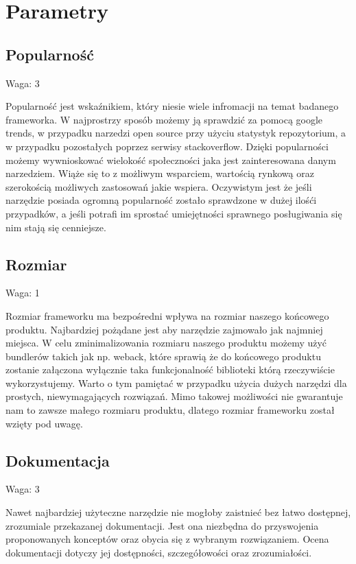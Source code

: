\documentclass[12pt]{report}
\begin{document}
  \section{Parametry}
    \subsection{Popularność}
      \begin{description}
        \item Waga: 3
      \end{description}
      Popularność jest wskaźnikiem, który niesie wiele infromacji na temat badanego frameworka.
      W najprostrzy sposób możemy ją sprawdzić za pomocą google trends, w przypadku narzedzi open source przy użyciu statystyk repozytorium, a w przypadku pozostałych poprzez serwisy stackoverflow.
      Dzięki popularności możemy wywnioskować wielokość społeczności jaka jest zainteresowana danym narzedziem.
      Wiąże się to z możliwym wsparciem, wartością rynkową oraz szerokością możliwych zastosowań jakie wspiera.
      Oczywistym jest że jeśli narzędzie posiada ogromną popularność zostało sprawdzone w dużej ilośći przypadków, a jeśli potrafi im sprostać umiejętności sprawnego posługiwania się nim stają się cenniejsze.

    \subsection{Rozmiar}
      \begin{description}
        \item Waga: 1
      \end{description}
      Rozmiar frameworku ma bezpośredni wpływa na rozmiar naszego końcowego produktu.
      Najbardziej pożądane jest aby narzędzie zajmowało jak najmniej miejsca.
      W celu zminimalizowania rozmiaru naszego produktu możemy użyć bundlerów takich jak np. weback, które sprawią że do końcowego produktu zostanie załączona wyłącznie taka funkcjonalność biblioteki którą rzeczywiście wykorzystujemy.
      Warto o tym pamiętać w przypadku użycia dużych narzędzi dla prostych, niewymagających rozwiązań.
      Mimo takowej możliwości nie gwarantuje nam to zawsze małego rozmiaru produktu, dlatego rozmiar frameworku został wzięty pod uwagę.

    \subsection{Dokumentacja}
      \begin{description}
        \item Waga: 3
      \end{description}
      Nawet najbardziej użyteczne narzędzie nie mogłoby zaistnieć bez łatwo dostępnej, zrozumiale przekazanej dokumentacji.
      Jest ona niezbędna do przyswojenia proponowanych konceptów oraz obycia się z wybranym rozwiązaniem.
      Ocena dokumentacji dotyczy jej dostępności, szczegółowości oraz zrozumiałości.
\end{document}
